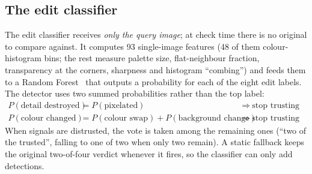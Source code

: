\subsection{The edit classifier}

The edit classifier receives \emph{only the query image}; at check time there is no
original to compare against. It computes 93 single-image features (48 of them colour-histogram
bins; the rest measure palette size, flat-neighbour fraction, transparency at the corners,
sharpness and histogram ``combing'') and feeds them to a Random Forest~\cite{breiman2001,sklearn}
that outputs a probability for each of the eight edit labels. The detector uses two summed
probabilities rather than the top label:
\begin{align*}
  P(\text{detail destroyed}) &= P(\text{pixelated}) &&\Rightarrow\ \text{stop trusting ORB}\\
  P(\text{colour changed})   &= P(\text{colour swap}) + P(\text{background change}) &&\Rightarrow\ \text{stop trusting hsvHash}
\end{align*}
When signals are distrusted, the vote is taken among the remaining ones (``two of the
trusted'', falling to one of two when only two remain). A static fallback keeps the original
two-of-four verdict whenever it fires, so the classifier can only add detections.
